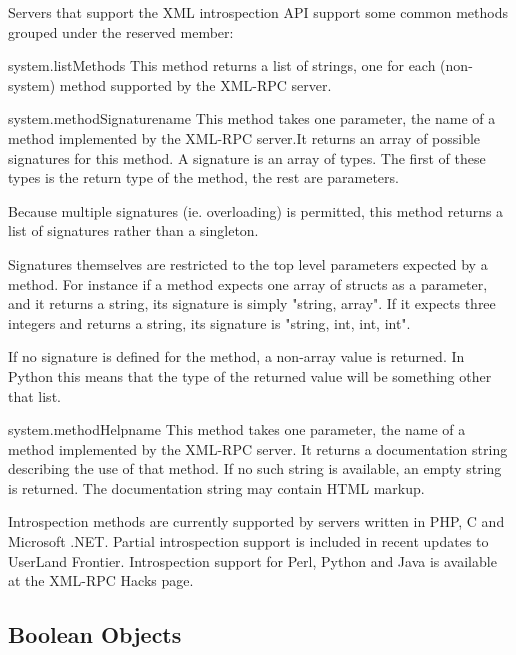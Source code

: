 Servers that support the XML introspection API support some common
methods grouped under the reserved  member:

\begin{methoddesc}{system.listMethods}{}
This method returns a list of strings, one for each (non-system)
method supported by the XML-RPC server.
\end{methoddesc}

\begin{methoddesc}{system.methodSignature}{name}
This method takes one parameter, the name of a method implemented by
the XML-RPC server.It returns an array of possible signatures for this
method. A signature is an array of types. The first of these types is
the return type of the method, the rest are parameters.

Because multiple signatures (ie. overloading) is permitted, this method
returns a list of signatures rather than a singleton.

Signatures themselves are restricted to the top level parameters
expected by a method. For instance if a method expects one array of
structs as a parameter, and it returns a string, its signature is
simply "string, array". If it expects three integers and returns a
string, its signature is "string, int, int, int".

If no signature is defined for the method, a non-array value is
returned. In Python this means that the type of the returned 
value will be something other that list.
\end{methoddesc}

\begin{methoddesc}{system.methodHelp}{name}
This method takes one parameter, the name of a method implemented by
the XML-RPC server.  It returns a documentation string describing the
use of that method. If no such string is available, an empty string is
returned. The documentation string may contain HTML markup.  
\end{methoddesc}

Introspection methods are currently supported by servers written in
PHP, C and Microsoft .NET. Partial introspection support is included
in recent updates to UserLand Frontier. Introspection support for
Perl, Python and Java is available at the XML-RPC Hacks page.


\subsection{Boolean Objects \label{boolean-objects}}

